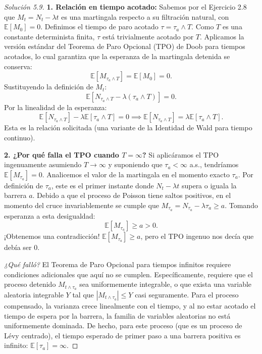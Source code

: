\documentclass[10pt,a4paper]{article}
\begin{document}
\begin{proof}[Solución 5.9]
    \textbf{1. Relación en tiempo acotado:}
    Sabemos por el Ejercicio 2.8 que $M_t = N_t - \lambda t$ es una martingala respecto a su filtración natural, con $\mathbb{E}[M_0] = 0$.
    Definimos el tiempo de paro acotado $\tau = \tau_a \wedge T$. Como $T$ es una constante determinista finita, $\tau$ está trivialmente acotado por $T$.
    Aplicamos la versión estándar del Teorema de Paro Opcional (TPO) de Doob para tiempos acotados, lo cual garantiza que la esperanza de la martingala detenida se conserva:
    \[ \mathbb{E}[M_{\tau_a \wedge T}] = \mathbb{E}[M_0] = 0. \]
    Sustituyendo la definición de $M_t$:
    \[ \mathbb{E}[N_{\tau_a \wedge T} - \lambda (\tau_a \wedge T)] = 0. \]
    Por la linealidad de la esperanza:
    \[ \mathbb{E}[N_{\tau_a \wedge T}] - \lambda \mathbb{E}[\tau_a \wedge T] = 0 \implies \mathbb{E}[N_{\tau_a \wedge T}] = \lambda \mathbb{E}[\tau_a \wedge T]. \]
    Esta es la relación solicitada (una variante de la Identidad de Wald para tiempo continuo).

    \textbf{2. ¿Por qué falla el TPO cuando $T = \infty$?}
    Si aplicáramos el TPO ingenuamente asumiendo $T \to \infty$ y suponiendo que $\tau_a < \infty$ a.s., tendríamos $\mathbb{E}[M_{\tau_a}] = 0$.
    Analicemos el valor de la martingala en el momento exacto $\tau_a$. Por definición de $\tau_a$, este es el primer instante donde $N_t - \lambda t$ supera o iguala la barrera $a$. 
    Debido a que el proceso de Poisson tiene saltos positivos, en el momento del cruce invariablemente se cumple que $M_{\tau_a} = N_{\tau_a} - \lambda \tau_a \ge a$.
    Tomando esperanza a esta desigualdad:
    \[ \mathbb{E}[M_{\tau_a}] \ge a > 0. \]
    ¡Obtenemos una contradicción! $\mathbb{E}[M_{\tau_a}] \ge a$, pero el TPO ingenuo nos decía que debía ser $0$.
    
    \textit{¿Qué falló?} El Teorema de Paro Opcional para tiempos infinitos requiere condiciones adicionales que aquí no se cumplen. Específicamente, requiere que el proceso detenido $M_{t \wedge \tau_a}$ sea uniformemente integrable, o que exista una variable aleatoria integrable $Y$ tal que $|M_{t \wedge \tau_a}| \le Y$ casi seguramente.
    Para el proceso compensado, la varianza crece linealmente con el tiempo, y al no estar acotado el tiempo de espera por la barrera, la familia de variables aleatorias no está uniformemente dominada. De hecho, para este proceso (que es un proceso de Lévy centrado), el tiempo esperado de primer paso a una barrera positiva es infinito: $\mathbb{E}[\tau_a] = \infty$.
\end{proof}
\end{document}
